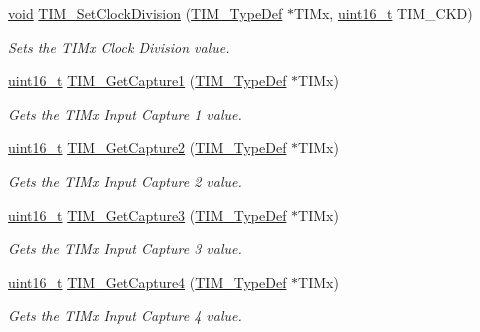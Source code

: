 \begin{DoxyCompactItemize}
\hyperlink{usb__devapi_8h_afabf60e7f57651d6d595a02c75f07cd0}{void} \hyperlink{group___t_i_m___private___functions_ga20ef804dc32c723662d11ee7da3baab2}{T\+I\+M\+\_\+\+Set\+Clock\+Division} (\hyperlink{struct_t_i_m___type_def}{T\+I\+M\+\_\+\+Type\+Def} $\ast$T\+I\+Mx, \hyperlink{_p_e___types_8h_a1f1825b69244eb3ad2c7165ddc99c956}{uint16\+\_\+t} T\+I\+M\+\_\+\+C\+KD)
\begin{DoxyCompactList}\small\item\em Sets the T\+I\+Mx Clock Division value. \end{DoxyCompactList}\item 
\hyperlink{_p_e___types_8h_a1f1825b69244eb3ad2c7165ddc99c956}{uint16\+\_\+t} \hyperlink{group___t_i_m___private___functions_ga29eb9f7151ceea94c3988539a5ee91cf}{T\+I\+M\+\_\+\+Get\+Capture1} (\hyperlink{struct_t_i_m___type_def}{T\+I\+M\+\_\+\+Type\+Def} $\ast$T\+I\+Mx)
\begin{DoxyCompactList}\small\item\em Gets the T\+I\+Mx Input Capture 1 value. \end{DoxyCompactList}\item 
\hyperlink{_p_e___types_8h_a1f1825b69244eb3ad2c7165ddc99c956}{uint16\+\_\+t} \hyperlink{group___t_i_m___private___functions_ga437fcf00ee9d0a9df9150cc120efc5ad}{T\+I\+M\+\_\+\+Get\+Capture2} (\hyperlink{struct_t_i_m___type_def}{T\+I\+M\+\_\+\+Type\+Def} $\ast$T\+I\+Mx)
\begin{DoxyCompactList}\small\item\em Gets the T\+I\+Mx Input Capture 2 value. \end{DoxyCompactList}\item 
\hyperlink{_p_e___types_8h_a1f1825b69244eb3ad2c7165ddc99c956}{uint16\+\_\+t} \hyperlink{group___t_i_m___private___functions_gab71d1d3d8a15f3be9e74dca51fcca5fa}{T\+I\+M\+\_\+\+Get\+Capture3} (\hyperlink{struct_t_i_m___type_def}{T\+I\+M\+\_\+\+Type\+Def} $\ast$T\+I\+Mx)
\begin{DoxyCompactList}\small\item\em Gets the T\+I\+Mx Input Capture 3 value. \end{DoxyCompactList}\item 
\hyperlink{_p_e___types_8h_a1f1825b69244eb3ad2c7165ddc99c956}{uint16\+\_\+t} \hyperlink{group___t_i_m___private___functions_ga09049af04c8345849c6f82ccfae242a6}{T\+I\+M\+\_\+\+Get\+Capture4} (\hyperlink{struct_t_i_m___type_def}{T\+I\+M\+\_\+\+Type\+Def} $\ast$T\+I\+Mx)
\begin{DoxyCompactList}\small\item\em Gets the T\+I\+Mx Input Capture 4 value. \end{DoxyCompactList}\item 

\end{DoxyCompactItemize}
